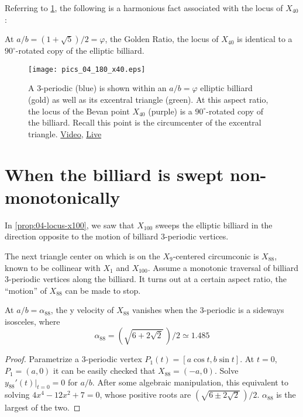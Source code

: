 Referring to \cref{fig:04-x40-golden}, the following is a harmonious fact associated with the locus of $X_{40}$:

\begin{corollary}
At $a/b = (1+\sqrt{5})/2=\varphi$, the Golden Ratio, the locus of $X_{40}$ is identical to a $90^\circ$-rotated copy of the elliptic billiard.
\label{cor:04-x40-golden}
\end{corollary}

\begin{figure}
    \centering
    \texttt{[image: pics\_04\_180\_x40.eps]}
    \caption{A 3-periodic (blue) is shown within an $a/b=\varphi$ elliptic billiard (gold) as well as its excentral triangle (green). At this aspect ratio, the locus of the Bevan point $X_{40}$ (purple) is a $90^\circ$-rotated copy of the billiard. Recall this point is the circumcenter of the excentral triangle. \href{https://youtu.be/rg28gGr-Qeo}{Video}, \href{https://bit.ly/3f4eQ6e}{Live}}
    \label{fig:04-x40-golden}
\end{figure}


\section{When the billiard is swept non-monotonically}

In \cref{prop:04-locus-x100}, we saw that $X_{100}$ sweeps the elliptic billiard in the direction opposite to the motion of billiard 3-periodic vertices.

The next triangle center on \cite{etc} which is on the $X_9$-centered circumconic is $X_{88}$, known to be collinear with $X_1$ and $X_{100}$. Assume a monotonic traversal of billiard 3-periodic vertices along the billiard. It turns out at a certain aspect ratio, the ``motion'' of $X_{88}$ can be made to stop. 

\begin{proposition}
At $a/b=\alpha_{88}$, the y velocity of $X_{88}$ vanishes when the 3-periodic is a sideways isosceles, where 
\[\alpha_{88}=(\sqrt{6+2\sqrt{2}}\,)/2\simeq{1.485} \]
\end{proposition}

\begin{proof}
Parametrize a 3-periodic vertex $P_1(t)=[a \cos{t},b \sin{t}]$. At $t=0$, $P_1=(a,0)$ it can be easily checked that $X_{88}=(-a,0)$. Solve $y_{88}'(t)|_{t=0}=0$ for $a/b$. After some algebraic manipulation, this equivalent to solving $4x^4-12x^2+7=0$, whose positive roots are $(\sqrt{6\pm 2\sqrt{2}}\,)/2$. $\alpha_{88} $ is the largest of the two.
\end{proof}

